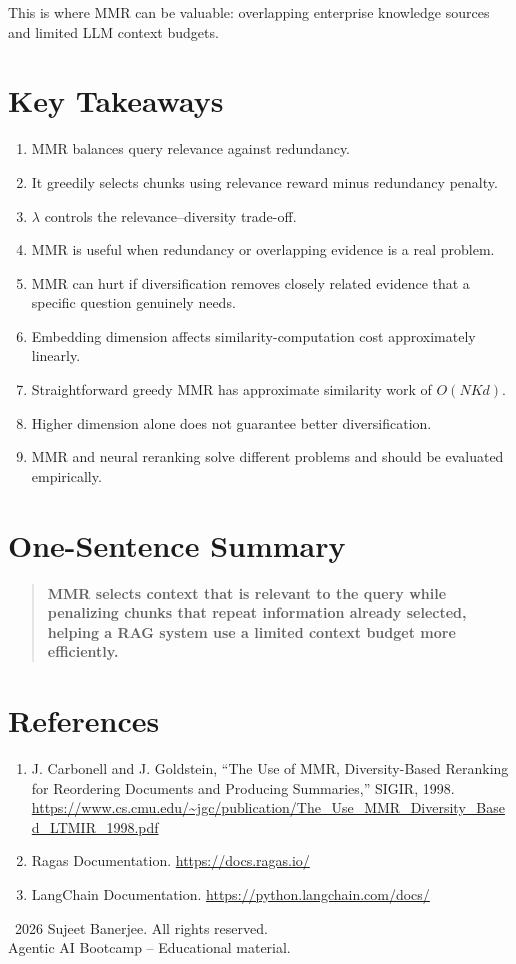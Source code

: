 \documentclass[12pt,a4paper]{article}
\begin{document}
This is where MMR can be valuable: overlapping enterprise knowledge sources and limited LLM context budgets.

\section{Key Takeaways}
\begin{enumerate}
\item MMR balances query relevance against redundancy.
\item It greedily selects chunks using relevance reward minus redundancy penalty.
\item $\lambda$ controls the relevance--diversity trade-off.
\item MMR is useful when redundancy or overlapping evidence is a real problem.
\item MMR can hurt if diversification removes closely related evidence that a specific question genuinely needs.
\item Embedding dimension affects similarity-computation cost approximately linearly.
\item Straightforward greedy MMR has approximate similarity work of $O(NKd)$.
\item Higher dimension alone does not guarantee better diversification.
\item MMR and neural reranking solve different problems and should be evaluated empirically.
\end{enumerate}

\section{One-Sentence Summary}
\begin{quote}\textbf{MMR selects context that is relevant to the query while penalizing chunks that repeat information already selected, helping a RAG system use a limited context budget more efficiently.}\end{quote}

\section{References}
\begin{enumerate}
\item J. Carbonell and J. Goldstein, ``The Use of MMR, Diversity-Based Reranking for Reordering Documents and Producing Summaries,'' SIGIR, 1998. \url{https://www.cs.cmu.edu/~jgc/publication/The_Use_MMR_Diversity_Based_LTMIR_1998.pdf}
\item Ragas Documentation. \url{https://docs.ragas.io/}
\item LangChain Documentation. \url{https://python.langchain.com/docs/}
\end{enumerate}

\vfill
\begin{center}\small
\textcopyright\ 2026 Sujeet Banerjee. All rights reserved.\\
Agentic AI Bootcamp -- Educational material.
\end{center}
\end{document}
